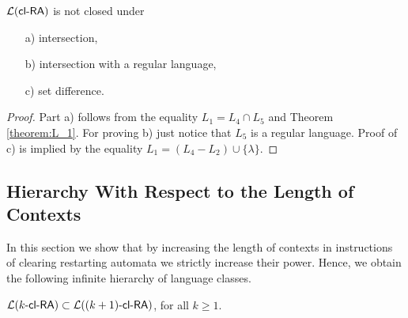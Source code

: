 \begin{corollary}
$\calL{\clRA}$ is not closed under
\begin{itemize}
    \item[a)]
        intersection,
    \item[b)]
        intersection with a regular language,
    \item[c)]
        set difference.
\end{itemize}
\end{corollary}

\begin{proof}
Part a) follows from the equality $L_1 = L_4 \cap L_5$ and Theorem \ref{theorem:L_1}. For proving b) just notice that $L_5$ is a regular language. Proof of c) is implied by the equality $L_1 = (L_4 - L_2) \cup \{ \lambda \}$.
\end{proof}

\subsection{Hierarchy With Respect to the Length of Contexts}
\label{se:k-hierarchy_k-cl-RA}

In this section we show that by increasing the length of contexts in instructions of clearing restarting automata we strictly increase their power. Hence, we obtain the following infinite hierarchy of language classes.

\begin{theorem}
$\calL{\kclRA} \subset \calL{\kclRA[(k+1)]}$, for all $k\ge 1$.
\end{theorem}

